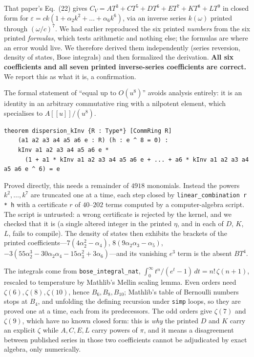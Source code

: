 \documentclass[11pt,a4paper]{article}
\theoremstyle{definition}
\newcommand{\lean}[1]{\texttt{\small #1}}
\begin{document}
That paper's Eq.~(22) gives $C_V = AT^3+CT^5+DT^6+ET^7+KT^8+LT^9$ in closed form for
$\varepsilon = ck(1+\alpha_2k^2+\dots+\alpha_6k^6)$, via an inverse series $k(\omega)$ printed through
$(\omega/c)^7$. We had earlier reproduced the six printed \emph{numbers} from the six printed
\emph{formulas}, which tests arithmetic and nothing else; the formulas are where an error would live.
We therefore derived them independently (series reversion, density of states, Bose integrals) and then
formalized the derivation. \textbf{All six coefficients and all seven printed inverse-series
coefficients are correct.} We report this as what it is, a confirmation.

The formal statement of ``equal up to $O(u^8)$'' avoids analysis entirely: it is an identity in an
arbitrary commutative ring with a nilpotent element, which specialises to $A[[u]]/(u^8)$.
\begin{verbatim}
theorem dispersion_kInv {R : Type*} [CommRing R]
    (a1 a2 a3 a4 a5 a6 e : R) (h : e ^ 8 = 0) :
    kInv a1 a2 a3 a4 a5 a6 e *
      (1 + a1 * kInv a1 a2 a3 a4 a5 a6 e + ... + a6 * kInv a1 a2 a3 a4 a5 a6 e ^ 6) = e
\end{verbatim}
Proved directly, this needs a remainder of $4918$ monomials. Instead the powers $k^2,\dots,k^7$ are
truncated one at a time, each step closed by \lean{linear\_combination r * h} with a certificate $r$ of
$40$--$202$ terms computed by a computer-algebra script. The script is untrusted: a wrong certificate
is rejected by the kernel, and we checked that it is (a single altered integer in the printed $\eta$,
and in each of $D$, $K$, $L$, fails to compile). The density of states then exhibits the brackets of the
printed coefficients---$7(4\alpha_2^2-\alpha_4)$, $8(9\alpha_2\alpha_3-\alpha_5)$,
$-3(55\alpha_2^3-30\alpha_2\alpha_4-15\alpha_3^2+3\alpha_6)$---and its vanishing $e^3$ term is the
absent $BT^4$.

The integrals come from \lean{bose\_integral\_nat}, $\int_0^\infty t^n/(e^t-1)\,dt = n!\,\zeta(n+1)$,
rescaled to temperature by Mathlib's Mellin scaling lemma. Even orders need $\zeta(6),\zeta(8),\zeta(10)$,
hence $B_6,B_8,B_{10}$; Mathlib's table of Bernoulli numbers stops at $B_4$, and unfolding the
defining recursion under \lean{simp} loops, so they are proved one at a time, each from its
predecessors. The odd orders give $\zeta(7)$ and $\zeta(9)$, which have no known closed form: this is
\emph{why} the printed $D$ and $K$ carry an explicit $\zeta$ while $A,C,E,L$ carry powers of $\pi$, and
it means a disagreement between published series in those two coefficients cannot be adjudicated by
exact algebra, only numerically.
\end{document}
